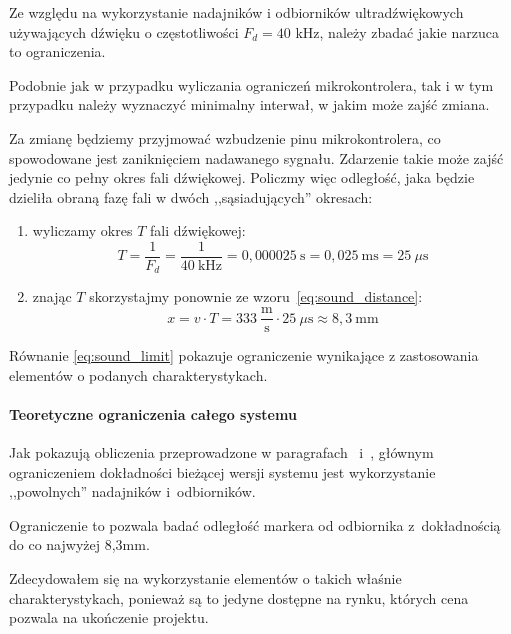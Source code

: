 Ze względu na wykorzystanie nadajników i odbiorników ultradźwiękowych używających dźwięku o częstotliwości $F_{d} = 40$ kHz, należy zbadać jakie narzuca to ograniczenia.

Podobnie jak w przypadku wyliczania ograniczeń mikrokontrolera, tak i w tym przypadku należy wyznaczyć minimalny interwał, w jakim może zajść zmiana.

Za zmianę będziemy przyjmować wzbudzenie pinu mikrokontrolera, co spowodowane jest zaniknięciem nadawanego sygnału. Zdarzenie takie może zajść jedynie co pełny okres fali dźwiękowej. Policzmy więc odległość, jaka będzie dzieliła obraną fazę fali w dwóch ,,sąsiadujących'' okresach:

\begin{enumerate}
 \item wyliczamy okres $T$ fali dźwiękowej:
    \begin{equation}
      T = \frac{1}{F_d} = \frac{1}{40~\textrm{kHz}} = 0,000025~\textrm{s} = 0,025~\textrm{ms} = 25~\mu\textrm{s}
    \end{equation}
 \item znając $T$ skorzystajmy ponownie ze wzoru~\ref{eq:sound_distance}:
    \begin{equation}
      x = v \cdot T = 333~\frac{\textrm{m}}{\textrm{s}} \cdot 25~\mu\textrm{s} \approx 8,3~\textrm{mm}
      \label{eq:sound_limit}
    \end{equation}
\end{enumerate}

Równanie \ref{eq:sound_limit} pokazuje ograniczenie wynikające z zastosowania elementów o podanych charakterystykach.

\paragraph{Teoretyczne ograniczenia całego systemu}
Jak pokazują obliczenia przeprowadzone w paragrafach~ i~, głównym ograniczeniem dokładności bieżącej wersji systemu jest wykorzystanie ,,powolnych'' nadajników i~odbiorników.

Ograniczenie to pozwala badać odległość markera od odbiornika z~dokładnością do co najwyżej 8,3mm.

Zdecydowałem się na wykorzystanie elementów  o takich właśnie charakterystykach, ponieważ są to jedyne dostępne na rynku, których cena pozwala na ukończenie projektu.

